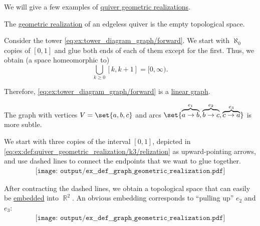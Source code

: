 \begin{example}\label{ex:def:quiver_geometric_realization}
  We will give a few examples of \hyperref[def:quiver_geometric_realization/undirected]{quiver geometric realizations}.

  \begin{thmenum}
     The \hyperref[def:quiver_geometric_realization/undirected]{geometric realization} of an edgeless quiver is the empty topological space.

     Consider the tower \eqref{eq:ex:tower_diagram_graph/forward}. We start with \( \aleph_0 \) copies of \( [0, 1] \) and glue both ends of each of them except for the first. Thus, we obtain (a space homeomorphic to)
    \begin{equation*}
      \bigcup_{k \geq 0} [k, k + 1] = [0, \infty).
    \end{equation*}

    Therefore, \eqref{eq:ex:tower_diagram_graph/forward} is a \hyperref[def:quiver_geometric_realization/linear]{linear graph}.

     The graph with vertices \( V = \set{ a, b, c } \) and arcs \( \set{ \overbrace{a \to b}^{e_1}, \overbrace{b \to c}^{e_2}, \overbrace{c \to a}^{e_3} } \) is more subtle.

    We start with three copies of the interval \( [0, 1] \), depicted in \eqref{eq:ex:def:quiver_geometric_realization/k3/relization} as upward-pointing arrows, and use dashed lines to connect the endpoints that we want to glue together.
    \begin{equation}\label{eq:ex:def:quiver_geometric_realization/k3/relization}
      \begin{aligned}
        \texttt{[image: output/ex\_\_def\_\_graph\_geometric\_realization.pdf]}
      \end{aligned}
    \end{equation}

    After contracting the dashed lines, we obtain a topological space that can easily be \hyperref[def:quiver_geometric_realization/embedding]{embedded} into \( \BbbR^2 \). An obvious embedding corresponds to \enquote{pulling up} \( e_2 \) and \( e_3 \):
    \begin{equation}\label{eq:ex:def:quiver_geometric_realization/k3/embedding}
      \begin{aligned}
        \texttt{[image: output/ex\_\_def\_\_graph\_geometric\_realization.pdf]}
      \end{aligned}
    \end{equation}


\end{thmenum}
\end{example}
